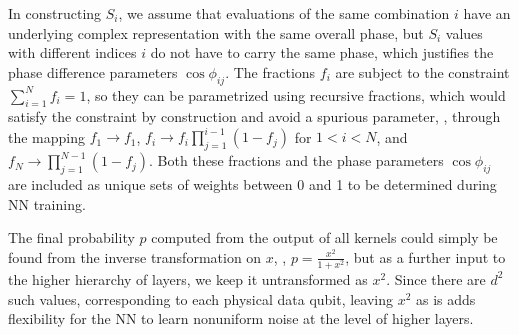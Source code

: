 In constructing $S_i$, we assume that evaluations of the same combination $i$ have an underlying complex representation with the same overall phase, but $S_i$ values with different indices $i$ do not have to carry the same phase, which justifies the phase difference parameters $\cos{\phi_{ij}}$.
The fractions $f_i$ are subject to the constraint $\sum_{i=1}^{N} f_i = 1$, so they can be parametrized using recursive fractions, which would satisfy the constraint by construction and avoid a spurious parameter, \ie, through the mapping $f_1 \to f_1$, $f_i \to f_i\prod_{j=1}^{i-1}\left(1-f_j\right)$ for $1<i<N$, and $f_N \to \prod_{j=1}^{N-1}\left(1-f_j\right)$. Both these fractions and the phase parameters $\cos{\phi_{ij}}$ are included as unique sets of weights between 0 and 1 to be determined during NN training.

The final probability $p$ computed from the output of all kernels could simply be found from the inverse transformation on $x$, \ie, $p=\frac{x^2}{1+x^2}$, but as a further input to the higher hierarchy of layers, we keep it untransformed as $x^2$. Since there are $d^2$ such values, corresponding to each physical data qubit, leaving $x^2$ as is adds flexibility for the NN to learn nonuniform noise at the level of higher layers.
